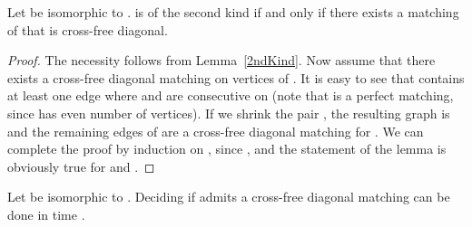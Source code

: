 \documentclass[10pt]{llncs}
\begin{document}
\begin{lemma} \label{2ndKindcyc}
  Let  be isomorphic to  .  is of the second kind if
  and only if there exists a matching  of  that is cross-free
  diagonal.
\end{lemma}

\begin{proof}
  The necessity follows from Lemma~\ref{2ndKind}.  Now assume that
  there exists a cross-free diagonal matching  on vertices of .
  It is easy to see that  contains at least one edge  where 
  and  are consecutive on  (note that  is a perfect matching,
  since  has even number of vertices). If we shrink the pair , the resulting graph is  and the remaining edges of
   are a cross-free diagonal matching for .  We can
  complete the proof by induction on , since , and the
  statement of the lemma is obviously true for  and .
\end{proof}

\begin{lemma} \label{WhatKind}
  Let  be isomorphic to . Deciding if  admits a
  cross-free diagonal matching can be done in time .
\end{lemma}
\end{document}
